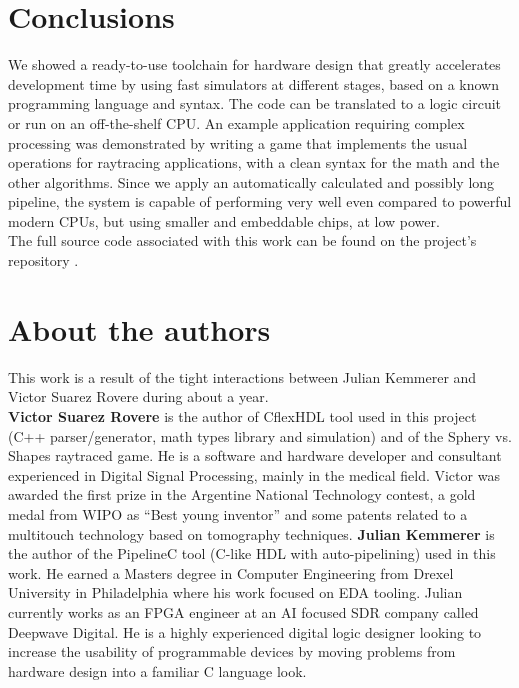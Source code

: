\documentclass[conference]{IEEEtran}
\begin{document}
\section{Conclusions}

We showed a ready-to-use toolchain for hardware design that greatly accelerates development time by using fast simulators at different stages, based on a known programming language and syntax. The code can be translated to a logic circuit or run on an off-the-shelf CPU. An example application requiring complex processing was demonstrated by writing a game that implements the usual operations for raytracing applications, with a clean syntax for the math and the other algorithms. Since we apply an automatically calculated and possibly long pipeline, the system is capable of performing very well even compared to powerful modern CPUs, but using smaller and embeddable chips, at low power.
\\

The full source code associated with this work can be found on the project's repository \cite{mainrepo}.
\\

\section{About the authors}
This work is a result of the tight interactions between Julian Kemmerer and Victor Suarez Rovere during about a year.
\\

\textbf{Victor Suarez Rovere} is the author of CflexHDL tool used in this project (C++ parser/generator, math types library and simulation) and of the Sphery vs. Shapes raytraced game. He is a software and hardware developer and consultant experienced in Digital Signal Processing, mainly in the medical ﬁeld. Victor was awarded the ﬁrst prize in the Argentine National Technology contest, a gold medal from WIPO as “Best young inventor” and some patents related to a multitouch technology based on tomography techniques. \textbf{Julian Kemmerer} is the author of the PipelineC tool (C-like HDL with auto-pipelining) used in this work. He earned a Masters degree in Computer Engineering from Drexel University in Philadelphia where his work focused on EDA tooling. Julian currently works as an FPGA engineer at an AI focused SDR company called Deepwave Digital. He is a highly experienced digital logic designer looking to increase the usability of programmable devices by moving problems from hardware design into a familiar C language look.
\\
\end{document}
